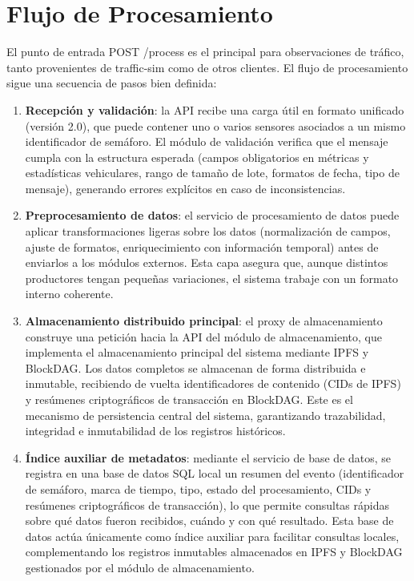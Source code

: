 \section{Flujo de Procesamiento}
\label{subsec:traffic_control_process}

El punto de entrada POST /process es el principal para observaciones de tráfico, tanto provenientes de traffic-sim como de otros clientes. El flujo de procesamiento sigue una secuencia de pasos bien definida:

\begin{enumerate}
    \item \textbf{Recepción y validación}: la API recibe una carga útil en formato unificado (versión 2.0), que puede contener uno o varios sensores asociados a un mismo identificador de semáforo. El módulo de validación verifica que el mensaje cumpla con la estructura esperada (campos obligatorios en métricas y estadísticas vehiculares, rango de tamaño de lote, formatos de fecha, tipo de mensaje), generando errores explícitos en caso de inconsistencias.
    \item \textbf{Preprocesamiento de datos}: el servicio de procesamiento de datos puede aplicar transformaciones ligeras sobre los datos (normalización de campos, ajuste de formatos, enriquecimiento con información temporal) antes de enviarlos a los módulos externos. Esta capa asegura que, aunque distintos productores tengan pequeñas variaciones, el sistema trabaje con un formato interno coherente.
    \item \textbf{Almacenamiento distribuido principal}: el proxy de almacenamiento construye una petición hacia la API del módulo de almacenamiento, que implementa el almacenamiento principal del sistema mediante IPFS y BlockDAG. Los datos completos se almacenan de forma distribuida e inmutable, recibiendo de vuelta identificadores de contenido (CIDs de IPFS) y resúmenes criptográficos de transacción en BlockDAG. Este es el mecanismo de persistencia central del sistema, garantizando trazabilidad, integridad e inmutabilidad de los registros históricos.
    \item \textbf{Índice auxiliar de metadatos}: mediante el servicio de base de datos, se registra en una base de datos SQL local un resumen del evento (identificador de semáforo, marca de tiempo, tipo, estado del procesamiento, CIDs y resúmenes criptográficos de transacción), lo que permite consultas rápidas sobre qué datos fueron recibidos, cuándo y con qué resultado. Esta base de datos actúa únicamente como índice auxiliar para facilitar consultas locales, complementando los registros inmutables almacenados en IPFS y BlockDAG gestionados por el módulo de almacenamiento.

\end{enumerate}

